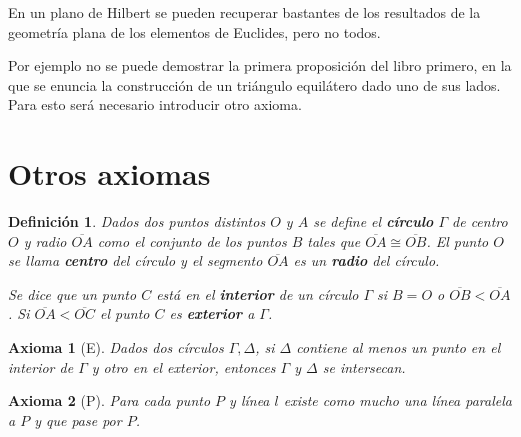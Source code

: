 \documentclass[12pt, spanish]{article}
\newtheorem*{defin}{Definición}
\theoremstyle{axstyle}
\theoremstyle{axbstyle}
\newtheorem{axb}{Axioma}
\begin{document}
En un plano de Hilbert se pueden recuperar bastantes de los resultados de la
geometría plana de los elementos de Euclides, pero no todos. 

Por ejemplo no se puede demostrar la primera proposición del libro primero, en
la que se enuncia la construcción de un triángulo equilátero dado uno de sus
lados. Para esto será necesario introducir otro axioma.

\section{Otros axiomas}

\begin{defin}
  Dados dos puntos distintos $O$ y $A$ se define el \textbf{círculo} $\Gamma$ de centro
  $O$ y radio $\overline{OA}$ como el conjunto de los puntos $B$ tales que
  $\overline{OA}\cong\overline{OB}$. El punto $O$ se llama \textbf{centro} del 
  círculo y el segmento $\overline{OA}$ es un \textbf{radio} del círculo.

  Se dice que un punto $C$ está en el \textbf{interior} de un círculo $\Gamma$
  si $B=O$ o $\overline{OB}<\overline{OA}$. Si $\overline{OA}<\overline{OC}$ el
  punto $C$ es \textbf{exterior} a $\Gamma$.
\end{defin}

\begin{axb}[E]\label{E}
  Dados dos círculos $\Gamma, \Delta$, si $\Delta$ contiene al menos un punto en
  el interior de $\Gamma$ y otro en el exterior, entonces $\Gamma$ y $\Delta$ se
  intersecan.
\end{axb}

\begin{axb}[P]\label{P}
  Para cada punto $P$ y línea $l$ existe como mucho una línea paralela a $P$ y
  que pase por $P$.
\end{axb}
\end{document}
